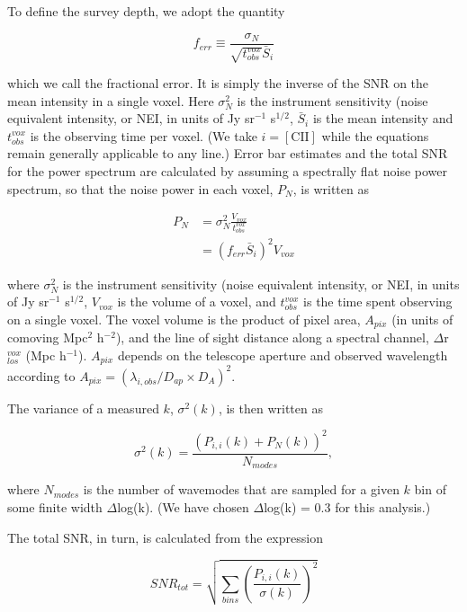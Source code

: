 \documentclass[iop,twocolappendix]{emulateapj}
\begin{document}
To define the survey depth, we adopt the quantity 

\begin{equation}
f_{err} \equiv \frac{\sigma_N}{\sqrt{t_{obs}^{vox}} \bar{S}_i}
\label{eq:ferr}
\end{equation}

which we call the fractional error. It is simply the inverse of the SNR on the mean intensity in a single voxel. Here $\sigma_N^2$ is the instrument sensitivity (noise equivalent intensity, or NEI, in units of Jy sr$^{-1}$ s$^{1/2}$, $\bar{S}_i$ is the mean intensity and $t_{obs}^{vox}$ is the observing time per voxel. (We take $i=\mathrm{[CII]}$ while the equations remain generally applicable to any line.) Error bar estimates and the total SNR for the power spectrum are calculated by assuming a spectrally flat noise power spectrum, so that the noise power in each voxel, $P_{N}$, is written as

\begin{align}
P_N & = \sigma_N^2 \frac{V_{vox}}{t_{obs}^{vox}} \\
& = \left(f_{err} \bar{S}_i \right)^2 V_{vox} \nonumber
\end{align}

where $\sigma_N^2$ is the instrument sensitivity (noise equivalent intensity, or NEI, in units of Jy sr$^{-1}$ s$^{1/2}$, $V_{vox}$ is the volume of a voxel, and $t_{obs}^{vox}$ is the time spent observing on a single voxel. The voxel volume is the product of pixel area, $A_{pix}$ (in units of comoving Mpc$^2$ h$^{-2}$), and the line of sight distance along a spectral channel, $\Delta$r$_{los}^{vox}$ (Mpc h$^{-1}$). $A_{pix}$ depends on the telescope aperture and observed wavelength according to $A_{pix} = (\lambda_{i,obs}/D_{ap}\times D_{A})^2$.

The variance of a measured $k$, $\sigma^2(k)$, is then written as

\begin{equation}
\sigma^2(k) = \frac{\left({P_{i,i}(k) + P_N(k)}\right)^{2}}{N_{modes}},
\end{equation}

where $N_{modes}$ is the number of wavemodes that are sampled for a given $k$ bin of some finite width $\Delta$log(k). (We have chosen $\Delta$log(k) = 0.3 for this analysis.)

The total SNR, in turn, is calculated from the expression 

\begin{equation}
SNR_{tot} = \sqrt{\sum_{bins} \left(\frac{P_{i,i}(k)}{\sigma(k)}\right)^2}
\end{equation}
\end{document}
